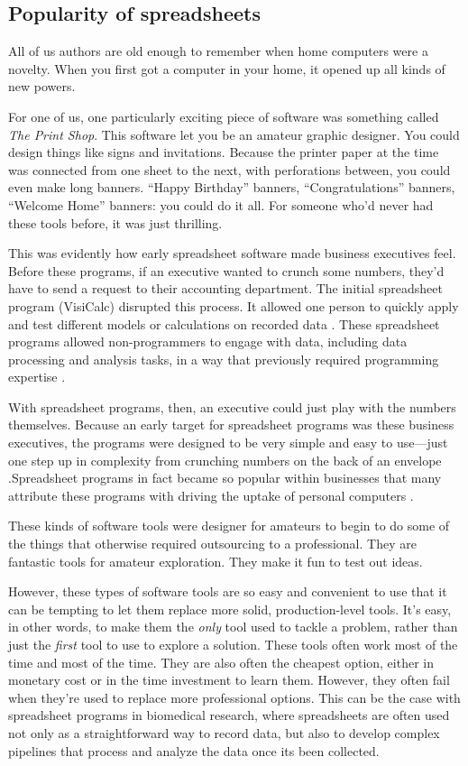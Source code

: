 \documentclass[]{tufte-book}
\begin{document}
\subsection{Popularity of spreadsheets}\label{popularity-of-spreadsheets}

All of us authors are old enough to remember when home computers were a novelty.
When you first got a computer in your home, it opened up all kinds of new powers.

For one of us, one particularly exciting piece of software was something called
\emph{The Print Shop}. This software let you be an amateur graphic designer. You could
design things like signs and invitations. Because the printer paper at the time
was connected from one sheet to the next, with perforations between, you could
even make long banners. ``Happy Birthday'' banners, ``Congratulations'' banners,
``Welcome Home'' banners: you could do it all. For someone who'd never had these
tools before, it was just thrilling.

This was evidently how early spreadsheet software made business executives feel.
Before these programs, if an executive wanted to crunch some numbers, they'd
have to send a request to their accounting department. The initial spreadsheet
program (VisiCalc) disrupted this process. It allowed one person to quickly
apply and test different models or calculations on recorded data
\citep{levy1984spreadsheet}. These spreadsheet programs allowed non-programmers to
engage with data, including data processing and analysis tasks, in a way that
previously required programming expertise \citep{levy1984spreadsheet}.

With spreadsheet programs, then, an executive could just play with the numbers
themselves. Because an early target for spreadsheet programs was these business
executives, the programs were designed to be very simple and easy to use---just
one step up in complexity from crunching numbers on the back of an envelope
\citep{campbell2007number}.Spreadsheet programs in fact became so popular within
businesses that many attribute these programs with driving the uptake of
personal computers \citep{campbell2007number}.

These kinds of software tools were designer for amateurs to begin to do some
of the things that otherwise required outsourcing to a professional. They are
fantastic tools for amateur exploration. They make it fun to test out ideas.

However, these types of software tools are so easy and convenient to use that it
can be tempting to let them replace more solid, production-level tools. It's
easy, in other words, to make them the \emph{only} tool used to tackle a problem,
rather than just the \emph{first} tool to use to explore a solution. These tools
often work most of the time and most of the time. They are also often the
cheapest option, either in monetary cost or in the time investment to learn
them. However, they often fail when they're used to replace more professional
options. This can be the case with spreadsheet programs in biomedical research,
where spreadsheets are often used not only as a straightforward way to record
data, but also to develop complex pipelines that process and analyze the data
once its been collected.
\end{document}
